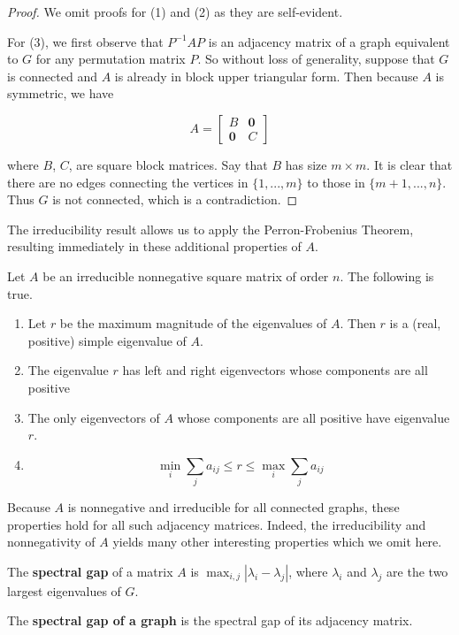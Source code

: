 \begin{proof}
  We omit proofs for (1) and (2) as they are self-evident.

  For (3), we first observe that $P^{-1}AP$ is an adjacency matrix of a graph
  equivalent to $G$ for any permutation matrix $P$. So without loss of generality, suppose that $G$ is
  connected and $A$ is already in block upper triangular form. Then because $A$
  is symmetric, we have

  \[
    A = \begin{bmatrix}
      B & \mathbf{0} \\
      \mathbf{0} & C
    \end{bmatrix}
  \]

  where $B$, $C$, are square block matrices. Say that $B$ has size $m \times m$. It is clear that
  there are no edges connecting the vertices in $\{1, ..., m\}$ to those in $\{m+1, ..., n\}$. Thus
  $G$ is not connected, which is a contradiction.
\end{proof}

The irreducibility result allows us to apply the Perron-Frobenius Theorem, resulting immediately in
these additional properties of $A$.

\begin{theorem}
  \label{thm:perron_frobenius}
  Let $A$ be an irreducible nonnegative square matrix of order $n$. The
  following is true.

  \begin{enumerate}
  \item Let $r$ be the maximum magnitude of the eigenvalues of $A$. Then $r$ is
    a (real, positive) simple eigenvalue of $A$.
  \item The eigenvalue $r$ has left and right eigenvectors whose components are
    all positive
  \item The only eigenvectors of $A$ whose components are all positive have
    eigenvalue $r$.
  \item
    \[ \min_i \sum_j a_{ij} \leq r \leq \max_i \sum_j a_{ij} \]
  \end{enumerate}
\end{theorem}

Because $A$ is nonnegative and irreducible for all connected graphs, these
properties hold for all such adjacency matrices. Indeed, the irreducibility and
nonnegativity of $A$ yields many other interesting properties which we omit
here.

\begin{definition}
  The \textbf{spectral gap} of a matrix $A$ is $\max_{i,j}|\lambda_i - \lambda_j|$, where
  $\lambda_i$ and $\lambda_j$ are the two largest eigenvalues of $G$.

  The \textbf{spectral gap of a graph} is the spectral gap of its adjacency matrix.
\end{definition}

